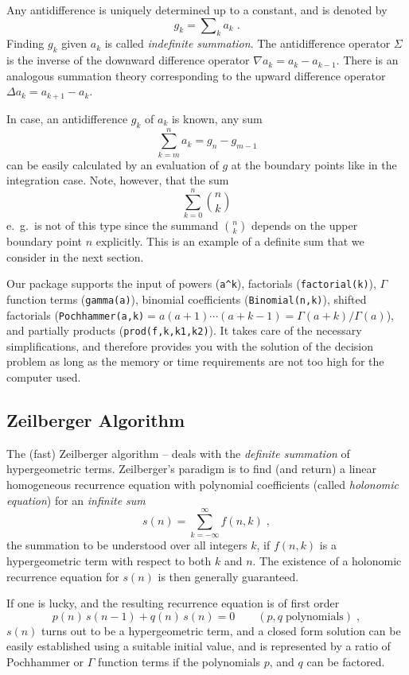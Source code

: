 Any antidifference is uniquely determined up to a constant, and is
denoted by
\[
g_k=\sum\nolimits_k a_k
\;.
\]
Finding $g_k$ given $a_k$ is called \textsl{indefinite summation}.
The antidifference operator $\Sigma$ is the inverse of the downward
difference operator $\nabla a_k=a_{k}-a_{k-1}$. There is an analogous
summation theory corresponding to the upward difference operator
$\Delta a_k=a_{k+1}-a_k$.

In case, an antidifference $g_k$ of $a_k$ is known, any sum
\[
\sum_{k=m}^{n} a_k=g_{n}-g_{m-1}
\]
can be easily calculated by an evaluation of $g$ at the boundary points
like in the integration case. Note, however, that the sum
\begin{equation}
\sum_{k=0}^n \binom{n}{k}
\label{eq:nchoosek}
\end{equation}
e.\ g.\
is not of this type since the summand $\binom{n}{k}$ depends on the upper
boundary point $n$ explicitly. This is an example of a definite sum
that we consider in the next section.

Our package supports the input of powers (\texttt{a\textasciicircum k}),
factorials (\texttt{factorial(k)}),
$\Gamma$ function terms (\texttt{gamma(a)}), binomial coefficients
(\texttt{Binomial(n,k)}), shifted factorials
(\texttt{Pochhammer(a,k)$=a(a+1)\cdots(a+k-1)=\Gamma (a+k)/\Gamma (a)$}), and
partially products (\texttt{prod(f,k,k1,k2)}).
It takes care of the necessary simplifications, and therefore
provides you with the solution of the decision problem
as long as the memory or time requirements are not too high for the
computer used.

\subsection{Zeilberger Algorithm}

The (fast) Zeilberger algorithm \cite{Zeilberger:90}--\cite{Zeilberger:91}
deals with the \textsl{definite summation} of
hypergeometric terms. Zeilberger's paradigm is to find (and return)
a linear homogeneous recurrence equation with polynomial coefficients
(called \textsl{holonomic equation}) for an \textsl{infinite sum}
\[
s(n)=\sum_{k=-\infty}^{\infty} f(n,k)
\;,
\]
the summation to be understood over all integers $k$,
if $f(n,k)$ is a hypergeometric term with respect to both $k$ and $n$.
The existence of a holonomic recurrence equation for $s(n)$ is then
generally guaranteed.

If one is lucky, and the resulting recurrence equation is of first order
\[
p(n)\,s(n-1)+q(n)\,s(n)=0
\quad\quad(p,q\;\mbox{polynomials})
\;,
\]
$s(n)$ turns out to be a hypergeometric term, and a closed form solution
can be easily established using a suitable initial value, and is
represented by a ratio of Pochhammer or $\Gamma$ function terms if the
polynomials $p$, and $q$ can be factored.

